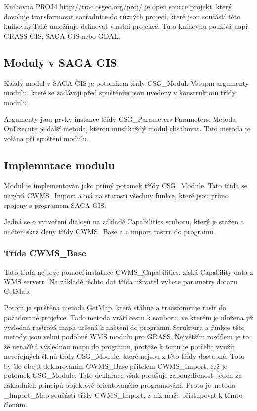 \documentclass[a4paper,12pt]{article}
\begin{document}
Knihovna PROJ4 \url{http://trac.osgeo.org/proj/} je open source projekt, který dovoluje transformovat souřadnice do různých projecí, které jsou součástí této knihovny.Také umožňuje definovat vlastní 
projekce. Tuto knihovnu používá např. GRASS GIS, SAGA GIS nebo GDAL.

\subsection{Moduly v SAGA GIS}

Každý modul v SAGA GIS je potomkem třídy CSG\_Modul. Vstupní argumenty modulu, které se zadávají před spuštěním jsou uvedeny v konstruktoru třídy modulu.

Argumenty jsou prvky instance třídy CSG\_Parameters Parameters. 
Metoda OnExecute je další metoda, kterou musí každý modul obsahovat. Tato metoda je volána při spuštění modulu. 


\subsection{Implemntace modulu}
Modul je implementován jako přímý potomek třídy CSG\_Module. Tato třída se nazývá CWMS\_Import a má na starosti všechny funkce, které jsou přímo spojeny s programem SAGA GIS.

Jedná se o vytvoření dialogů na základě Capabilities souboru, který je stažen a načten  skrz členy třídy CWMS\_Base a o import rastru do programu. 

\subsubsection{Třída CWMS\_Base}

Tato třída nejprve pomocí instatnce CWMS\_Capabilities, získá Capability data z WMS serveru. Na základě těchto dat třída uživatel vybere parametry dotazu GetMap. 

Potom je spuštěna metoda GetMap, která stáhne a transfomruje rastr do požadované projekce. Tado metoda vrátí cestu k souboru, ve kterém je uložena již výsledná rastrová mapa určená k načtení do programu.
Struktura a funkce této metody jsou velmi podobné WMS modulu pro GRASS. Největším rozdílem je to, že nenačítá výslednou mapu do programu, protože k tomu je potřeba využít neveřejných členů třídy CSG\_Module, 
které nejsou z této třídy dostupné. Toto by šlo obejít deklarováním CWMS\_Base přítelem CWMS\_Import, což je potomek CSG\_Module. Tato deklarace však porušuje zapouzdřenost, jeden za základních principů objektově orientovaného
programování. Proto je metoda \_Import\_Map součástí třídy CWMS\_Import, z níž může přistupovat k těmto členům.
\end{document}
